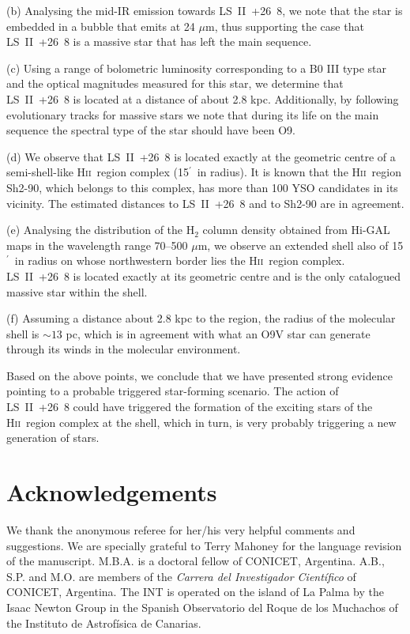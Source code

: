 \documentclass[fleqn,usenatbib]{mnras}
\def\m{$^\prime$}
\def\hii{H\textsc{ii}}
\begin{document}
(b) Analysing the mid-IR emission towards LS~II~+26~8, we note that the star is embedded 
in a bubble that emits at 24 $\mu$m, thus supporting the case that LS~II~+26~8 is a massive star that has left the main sequence. 

(c) Using a range of bolometric luminosity corresponding to a B0 III type star and the optical
 magnitudes measured for this star, we determine that LS~II~+26~8 is located at a distance 
of about 2.8 kpc. Additionally, by following evolutionary tracks for massive stars we note that 
during its life on the main sequence the spectral type of the star should have been O9.

(d) We observe that LS~II~+26~8 is located exactly at the geometric centre of a semi-shell-like 
\hii~region complex (15\m~in radius). It is known that the  \hii~region Sh2-90, which belongs 
to this complex, has more than 100 YSO candidates in its vicinity. The estimated distances 
to LS~II~+26~8 and to Sh2-90 are in agreement.

(e) Analysing the distribution of the H$_2$ column density obtained from Hi-GAL maps in the 
wavelength range 70--500 $\mu$m, we observe an extended shell also of 15\m~in radius on whose 
northwestern border lies the \hii~region complex. LS~II~+26~8 is located exactly at its geometric 
centre and is the only catalogued massive star within the shell.

(f) Assuming a distance about 2.8 kpc to the region, the radius of the molecular shell is 
$\sim13$ pc, which is in agreement with what an O9V star can generate through its winds in 
the molecular environment. 

Based on the above points, we conclude that we have presented strong evidence pointing to a 
probable triggered star-forming scenario. The action of LS~II~+26~8 could have triggered the 
formation of the exciting stars of the \hii~region complex at the shell, which in turn, is
very probably triggering a new generation of stars. 



\section*{Acknowledgements}

We thank the anonymous referee for her/his very helpful comments and suggestions. We are specially grateful to Terry Mahoney for the language revision of the manuscript.
M.B.A. is a doctoral fellow of CONICET, Argentina.
A.B., S.P. and  M.O. are members of the {\sl Carrera del Investigador Cient\'ifico} of CONICET, Argentina.
The INT is operated on the island of La Palma by the Isaac Newton Group in the Spanish Observatorio del 
Roque de los Muchachos of the Instituto de Astrof\'isica de Canarias.
\end{document}
